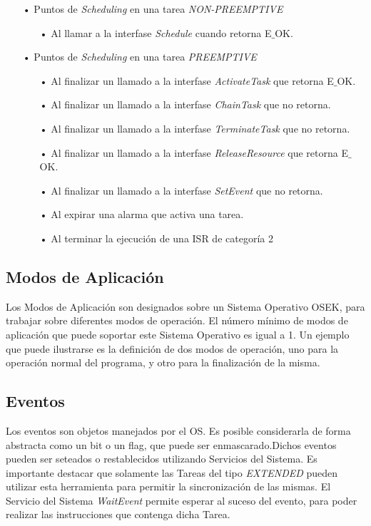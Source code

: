 \documentclass[12pt,letterpaper]{article}
\begin{document}
\begin{enumerate}
\item[•]Puntos de \textit{Scheduling} en una tarea \textit{NON-PREEMPTIVE}
\begin{enumerate}
\item[•]Al llamar a la interfase \textit{Schedule} cuando retorna E$\_$OK.
\end{enumerate}
\item[•]Puntos de \textit{Scheduling} en una tarea \textit{PREEMPTIVE}
\begin{enumerate}
\item[•]Al finalizar un llamado a la interfase \textit{ActivateTask} que retorna E$\_$OK.
\item[•]Al finalizar un llamado a la interfase \textit{ChainTask} que no retorna.
\item[•]Al finalizar un llamado a la interfase \textit{TerminateTask} que no retorna.
\item[•]Al finalizar un llamado a la interfase \textit{ReleaseResource} que retorna E$\_$OK.
\item[•]Al finalizar un llamado a la interfase \textit{SetEvent} que no retorna.
\item[•]Al expirar una alarma que activa una tarea.
\item[•]Al terminar la ejecución de una ISR de categoría 2
\end{enumerate}
\end{enumerate} 

\subsection{Modos de Aplicación}
Los Modos de Aplicación son designados sobre un Sistema Operativo OSEK, para trabajar sobre diferentes modos de operación. El número mínimo de modos de aplicación que puede soportar este Sistema Operativo es igual a 1. Un ejemplo que puede ilustrarse es la definición de dos modos de operación, uno para la operación normal del programa, y otro para la finalización de la misma.

\subsection{Eventos}

Los eventos son objetos manejados por el OS. Es posible considerarla de forma abstracta como un bit o un flag, que puede ser enmascarado.Dichos eventos pueden ser seteados o restablecidos utilizando Servicios del Sistema. Es importante destacar que solamente las Tareas del tipo \textit{EXTENDED} pueden utilizar esta herramienta para permitir la sincronización de las mismas. El Servicio del Sistema \textit{WaitEvent} permite esperar al suceso del evento, para poder realizar las instrucciones que contenga dicha Tarea.
\end{document}

